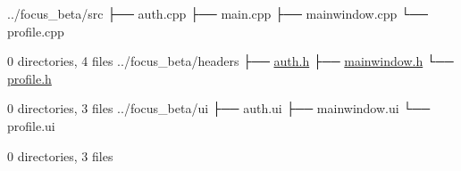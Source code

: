 ../focus\+\_\+beta/src ├── auth.\+cpp ├── main.\+cpp ├── mainwindow.\+cpp └── profile.\+cpp

0 directories, 4 files ../focus\+\_\+beta/headers ├── \mbox{\hyperlink{auth_8h_source}{auth.\+h}} ├── \mbox{\hyperlink{mainwindow_8h_source}{mainwindow.\+h}} └── \mbox{\hyperlink{profile_8h_source}{profile.\+h}}

0 directories, 3 files ../focus\+\_\+beta/ui ├── auth.\+ui ├── mainwindow.\+ui └── profile.\+ui

0 directories, 3 files 